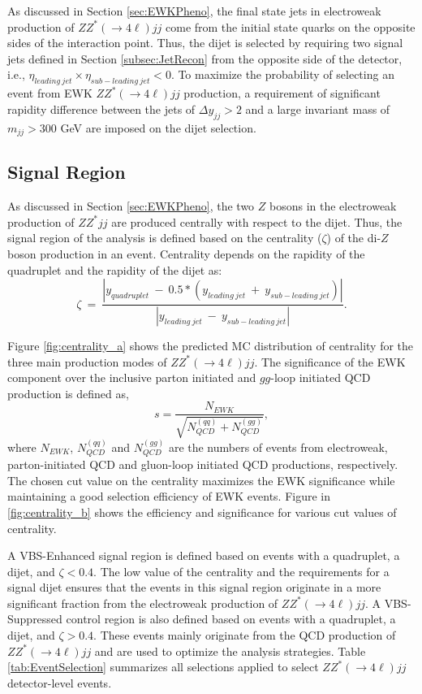 As discussed in Section \ref{sec:EWKPheno}, the final state jets in electroweak production of $ZZ^*(\rightarrow 4\ell) jj$ come from the initial state quarks on the opposite sides of the interaction point. Thus, the dijet is selected by requiring two signal jets defined in Section \ref{subsec:JetRecon} from the opposite side of the detector, i.e., $\eta_{leading~jet} \times \eta_{sub-leading~jet} < 0$. To maximize the probability of selecting an event from EWK $ZZ^*(\rightarrow 4\ell)jj$ production, a requirement of significant rapidity difference between the jets of $\Delta y_{jj}> 2 $ and a large invariant mass of $m_{jj} > 300 $ GeV are imposed on the dijet selection. 

\subsection{Signal Region}
\label{subsec:SignalRegion}
As discussed in Section \ref{sec:EWKPheno}, the two $Z$ bosons in the electroweak production of $ZZ^*jj$ are produced centrally with respect to the dijet. Thus, the signal region of the analysis is defined based on the centrality ($\zeta$) of the di-$Z$boson production in an event. Centrality depends on the rapidity of the quadruplet and the rapidity of the dijet as:
\begin{equation}
    \zeta~=~\frac{|y_{quadruplet}~-~ 0.5*(y_{leading~jet}~+~y_{sub-leading~jet})| }{|y_{leading~jet}~-~y_{sub-leading~jet}|}.
    \label{eq:centr}
\end{equation}

Figure \ref{fig:centrality_a} shows the predicted MC distribution of centrality for the three main production modes of $ZZ^*(\rightarrow 4 \ell)jj$. The significance of the EWK component over the inclusive parton initiated and $gg$-loop initiated QCD production is defined as, 
\begin{equation}
    s=\frac{N_{EWK}}{\sqrt{N_{QCD}^{(qq)}+N_{QCD}^{(gg)}}},
    \label{eqn:EWKSignificance}
\end{equation}
where $N_{EWK}$, $N_{QCD}^{(qq)}$ and $N_{QCD}^{(gg)}$ are the numbers of events from electroweak, parton-initiated QCD and gluon-loop initiated QCD productions, respectively. The chosen cut value on the centrality maximizes the EWK significance while maintaining a good selection efficiency of EWK events. Figure in \ref{fig:centrality_b} shows the efficiency and significance for various cut values of centrality.  

A VBS-Enhanced signal region is defined based on events with a quadruplet, a dijet, and $\zeta<0.4$. The low value of the centrality and the requirements for a signal dijet ensures that the events in this signal region originate in a more significant fraction from the electroweak production of $ZZ^*(\rightarrow 4 \ell) jj$. A VBS-Suppressed control region is also defined based on events with a quadruplet, a dijet, and $\zeta>0.4$. These events mainly originate from the QCD production of $ZZ^*(\rightarrow 4 \ell) jj$ and are used to optimize the analysis strategies. Table \ref{tab:EventSelection} summarizes all selections applied to select $ZZ^*(\rightarrow 4\ell)jj$ detector-level events.

